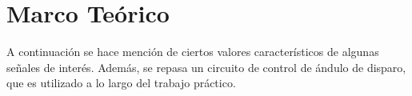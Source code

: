   \section{Marco Teórico}
   A continuación se hace mención de ciertos valores característicos 
   de algunas señales de interés. Además, se repasa un circuito de control de
    ándulo de disparo, que es utilizado a lo largo del trabajo práctico.
    
    
    